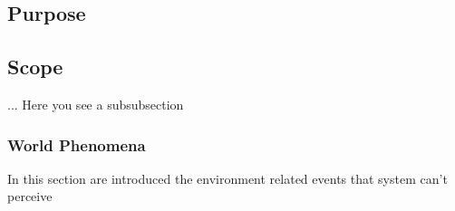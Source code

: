 


\subsection{Purpose}

\subsection{Scope}
... Here you see a subsubsection

\subsubsection{World Phenomena}
In this section are introduced the environment related events that system can't perceive

